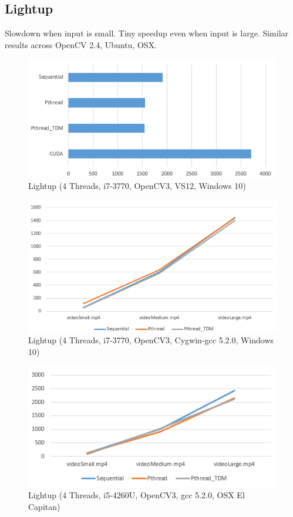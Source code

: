 \documentclass{acm_proc_article-sp}
\begin{document}
\subsection{Lightup}
Slowdown when input is small. Tiny speedup even when input is large. Similar results across OpenCV 2.4, Ubuntu, OSX.
\begin{figure}[H]
  \includegraphics[width=\linewidth,natwidth=526,natheight=251]{lightup.png}
  \caption{Lightup (4 Threads, i7-3770, OpenCV3, VS12, Windows 10)}
  \label{fig:lightup}
\end{figure}
\begin{figure}[H]
  \includegraphics[width=\linewidth,natwidth=579,natheight=307]{lightup_sml.png}
  \caption{Lightup (4 Threads, i7-3770, OpenCV3, Cygwin-gcc 5.2.0, Windows 10)}
  \label{fig:lightup_sml}
\end{figure}
\begin{figure}[H]
  \includegraphics[width=\linewidth,natwidth=475,natheight=231]{lightup_osx.png}
  \caption{Lightup (4 Threads, i5-4260U, OpenCV3, gcc 5.2.0, OSX El Capitan)}
  \label{fig:lightup_osx}
\end{figure}
\end{document}
